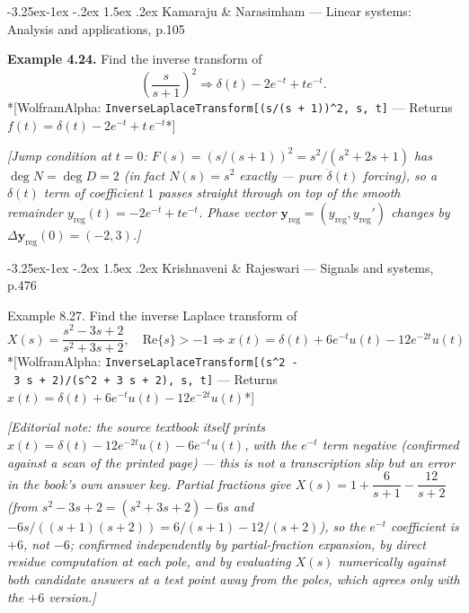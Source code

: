 \documentclass[
  11pt,
]{article}
\makeatletter
\providecommand{\implies}{\Longrightarrow}
\renewcommand\paragraph{\@startsection{paragraph}{4}{\z@}%
                                     {-3.25ex\@plus -1ex \@minus -.2ex}%
                                     {1.5ex \@plus .2ex}%
                                     {\normalfont\normalsize\bfseries}}
\makeatother
\begin{document}
\hypertarget{kamaraju-narasimham-linear-systems-analysis-and-applications-p.105}{%
\paragraph{Kamaraju \& Narasimham --- Linear systems: Analysis and
applications,
p.105}\label{kamaraju-narasimham-linear-systems-analysis-and-applications-p.105}}

\textbf{Example 4.24.} Find the inverse transform of \[
\left(\frac{s}{s+1}\right)^2 \implies \delta(t) - 2e^{-t} + t e^{-t}.
\] *{[}WolframAlpha:
\texttt{InverseLaplaceTransform{[}(s/(s\ +\ 1))\^{}2,\ s,\ t{]}} ---
Returns \(f(t) = \delta(t) - 2e^{-t} + t\,e^{-t}\)*{]}

\emph{{[}Jump condition at \(t=0\): \(F(s)=(s/(s+1))^2=s^2/(s^2+2s+1)\)
has \(\deg N=\deg D=2\) (in fact \(N(s)=s^2\) exactly --- pure
\(\ddot\delta(t)\) forcing), so a \(\delta(t)\) term of coefficient
\(1\) passes straight through on top of the smooth remainder
\(y_{\text{reg}}(t)=-2e^{-t}+te^{-t}\). Phase vector
\(\mathbf y_{\text{reg}}=(y_{\text{reg}},y_{\text{reg}}')\) changes by
\(\Delta\mathbf y_{\text{reg}}(0)=(-2,3)\).{]}}

\hypertarget{krishnaveni-rajeswari-signals-and-systems-p.476}{%
\paragraph{Krishnaveni \& Rajeswari --- Signals and systems,
p.476}\label{krishnaveni-rajeswari-signals-and-systems-p.476}}

Example 8.27. Find the inverse Laplace transform of \[
X(s) = \frac{s^2 - 3s + 2}{s^2 + 3s + 2}, \quad \text{Re}\{s\} > -1 \implies x(t) = \delta(t) + 6e^{-t}u(t) - 12e^{-2t}u(t)
\] *{[}WolframAlpha:
\texttt{InverseLaplaceTransform{[}(s\^{}2\ -\ 3\ s\ +\ 2)/(s\^{}2\ +\ 3\ s\ +\ 2),\ s,\ t{]}}
--- Returns \(x(t) = \delta(t) + 6e^{-t}u(t) - 12e^{-2t}u(t)\)*{]}

\emph{{[}Editorial note: the source textbook itself prints
\(x(t)=\delta(t)-12e^{-2t}u(t)-6e^{-t}u(t)\), with the \(e^{-t}\) term
negative (confirmed against a scan of the printed page) --- this is not
a transcription slip but an error in the book's own answer key. Partial
fractions give \(X(s)=1+\dfrac{6}{s+1}-\dfrac{12}{s+2}\) (from
\(s^2-3s+2=(s^2+3s+2)-6s\) and \(-6s/((s+1)(s+2))=6/(s+1)-12/(s+2)\)),
so the \(e^{-t}\) coefficient is \(+6\), not \(-6\); confirmed
independently by partial-fraction expansion, by direct residue
computation at each pole, and by evaluating \(X(s)\) numerically against
both candidate answers at a test point away from the poles, which agrees
only with the \(+6\) version.{]}}
\end{document}
